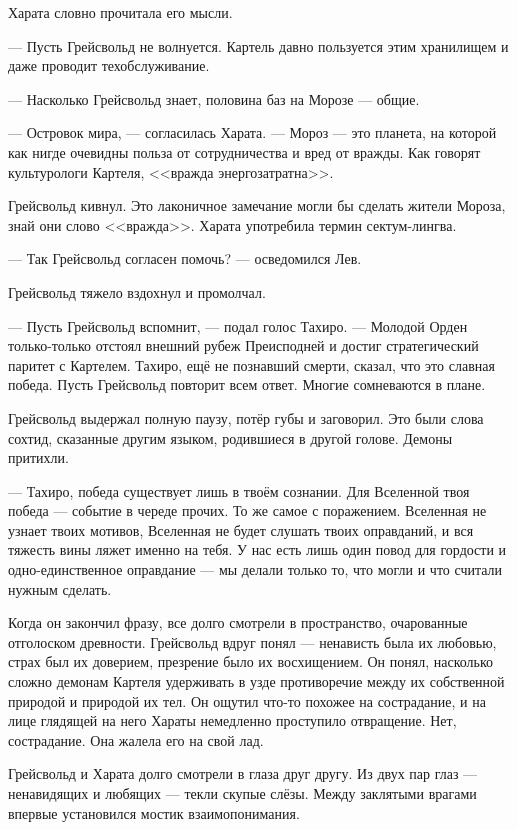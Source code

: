 Харата словно прочитала его мысли.

--- Пусть Грейсвольд не волнуется.
Картель давно пользуется этим хранилищем и даже проводит техобслуживание.

--- Насколько Грейсвольд знает, половина баз на Морозе --- общие.

--- Островок мира, --- согласилась Харата.
--- Мороз --- это планета, на которой как нигде очевидны польза от сотрудничества и вред от вражды.
Как говорят культурологи Картеля, <<вражда энергозатратна>>.

Грейсвольд кивнул.
Это лаконичное замечание могли бы сделать жители Мороза, знай они слово <<вражда>>.
Харата употребила термин сектум-лингва.

--- Так Грейсвольд согласен помочь? --- осведомился Лев.

Грейсвольд тяжело вздохнул и промолчал.

--- Пусть Грейсвольд вспомнит, --- подал голос Тахиро.
--- Молодой Орден только-только отстоял внешний рубеж Преисподней и достиг стратегический паритет с Картелем.
Тахиро, ещё не познавший смерти, сказал, что это славная победа.
Пусть Грейсвольд повторит всем ответ.
Многие сомневаются в плане.

Грейсвольд выдержал полную паузу, потёр губы и заговорил.
Это были слова сохтид, сказанные другим языком, родившиеся в другой голове.
Демоны притихли.

--- Тахиро, победа существует лишь в твоём сознании.
Для Вселенной твоя победа --- событие в череде прочих.
То же самое с поражением.
Вселенная не узнает твоих мотивов, Вселенная не будет слушать твоих оправданий, и вся тяжесть вины ляжет именно на тебя.
У нас есть лишь один повод для гордости и одно-единственное оправдание --- мы делали только то, что могли и что считали нужным сделать.

Когда он закончил фразу, все долго смотрели в пространство, очарованные отголоском древности.
Грейсвольд вдруг понял --- ненависть была их любовью, страх был их доверием, презрение было их восхищением.
Он понял, насколько сложно демонам Картеля удерживать в узде противоречие между их собственной природой и природой их тел.
Он ощутил что-то похожее на сострадание, и на лице глядящей на него Хараты немедленно проступило отвращение.
Нет, сострадание.
Она жалела его на свой лад.

Грейсвольд и Харата долго смотрели в глаза друг другу.
Из двух пар глаз --- ненавидящих и любящих --- текли скупые слёзы.
Между заклятыми врагами впервые установился мостик взаимопонимания.


